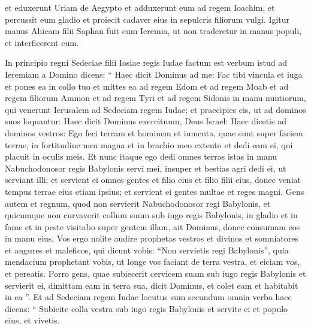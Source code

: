 \begin{biblechapter}
\begin{biblechapter}
\begin{biblechapter}
\begin{biblechapter}
\begin{biblechapter}
\begin{biblechapter}
\begin{biblechapter}
\begin{biblechapter}
\begin{biblechapter}
\begin{biblechapter}
\begin{biblechapter}
\begin{biblechapter}
\begin{biblechapter}
\begin{biblechapter}
\begin{biblechapter}
\begin{biblechapter}
\begin{biblechapter}
\begin{biblechapter}
\begin{biblechapter}
\begin{biblechapter}
\begin{biblechapter}
\begin{biblechapter}
\begin{biblechapter}
\begin{biblechapter}
\begin{biblechapter}
\begin{biblechapter}
\verse et eduxerunt Uriam de Aegypto et adduxerunt eum ad regem Ioachim, et percussit eum gladio et proiecit cadaver eius in sepulcris filiorum vulgi. 
\verse Igitur manus Ahicam filii Saphan fuit cum Ieremia, ut non traderetur in manus populi, et interficerent eum.
 
\begin{biblechapter}
\verse In principio regni Sedeciae filii Iosiae regis Iudae factum est verbum istud ad Ieremiam a Domino dicens: 
\verse “ Haec dicit Dominus ad me: Fac tibi vincula et iuga et pones ea in collo tuo 
\verse et mittes ea ad regem Edom et ad regem Moab et ad regem filiorum Ammon et ad regem Tyri et ad regem Sidonis in manu nuntiorum, qui venerunt Ierusalem ad Sedeciam regem Iudae; 
\verse et praecipies eis, ut ad dominos suos loquantur: Haec dicit Dominus exercituum, Deus Israel: Haec dicetis ad dominos vestros: 
\verse Ego feci terram et hominem et iumenta, quae sunt super faciem terrae, in fortitudine mea magna et in brachio meo extento et dedi eam ei, qui placuit in oculis meis. 
\verse Et nunc itaque ego dedi omnes terras istas in manu Nabuchodonosor regis Babylonis servi mei, insuper et bestias agri dedi ei, ut serviant illi; 
\verse et servient ei omnes gentes et filio eius et filio filii eius, donec veniat tempus terrae eius etiam ipsius; et servient ei gentes multae et reges magni. 
\verse Gens autem et regnum, quod non servierit Nabuchodonosor regi Babylonis, et quicumque non curvaverit collum suum sub iugo regis Babylonis, in gladio et in fame et in peste visitabo super gentem illam, ait Dominus, donec consumam eos in manu eius. 
 \verse Vos ergo nolite audire prophetas vestros et divinos et somniatores et augures et maleficos, qui dicunt vobis: “Non servietis regi Babylonis”, 
\verse quia mendacium prophetant vobis, ut longe vos faciant de terra vestra, et eiciam vos, et pereatis. 
\verse Porro gens, quae subiecerit cervicem suam sub iugo regis Babylonis et servierit ei, dimittam eam in terra sua, dicit Dominus, et colet eam et habitabit in ea ”.
 \verse Et ad Sedeciam regem Iudae locutus sum secundum omnia verba haec dicens: “ Subicite colla vestra sub iugo regis Babylonis et servite ei et populo eius, et vivetis. 

\end{biblechapter}
\end{biblechapter}
\end{biblechapter}
\end{biblechapter}
\end{biblechapter}
\end{biblechapter}
\end{biblechapter}
\end{biblechapter}
\end{biblechapter}
\end{biblechapter}
\end{biblechapter}
\end{biblechapter}
\end{biblechapter}
\end{biblechapter}
\end{biblechapter}
\end{biblechapter}
\end{biblechapter}
\end{biblechapter}
\end{biblechapter}
\end{biblechapter}
\end{biblechapter}
\end{biblechapter}
\end{biblechapter}
\end{biblechapter}
\end{biblechapter}
\end{biblechapter}
\end{biblechapter}
